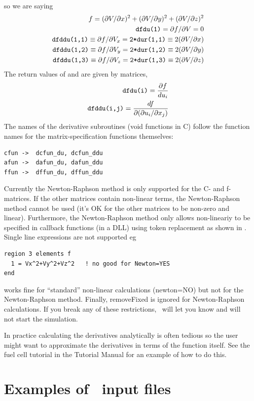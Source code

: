 \documentclass[a4paper,twoside,11pt]{book}
\begin{document}
so we are saying
\begin{eqnarray}
  f=(\partial V/\partial x)^2+(\partial V/\partial y)^2+(\partial V/\partial z)^2\\
  \texttt{dfdu(1)}=\partial f/\partial V = 0\\
  \texttt{dfddu(1,1)}\equiv \partial f/\partial V_x=\texttt{2*dur(1,1)}\equiv 2(\partial V/\partial x)\\
  \texttt{dfddu(1,2)}\equiv \partial f/\partial V_y=\texttt{2*dur(1,2)}\equiv 2(\partial V/\partial y)\\
  \texttt{dfddu(1,3)}\equiv \partial f/\partial V_z=\texttt{2*dur(1,3)}\equiv 2(\partial V/\partial z)
\end{eqnarray}
The return values of  and  are given by matrices,
\begin{eqnarray}
  \texttt{dfdu(i)}=\frac{\partial f}{d u_i}\\
  \texttt{dfddu(i,j)}=\frac{d f}{\partial(\partial u_i/\partial x_j)}
\end{eqnarray}
The names of the derivative subroutines (void functions in C) follow
the function names for the matrix-specification functions themselves:
\begin{verbatim}
cfun ->  dcfun_du, dcfun_ddu
afun ->  dafun_du, dafun_ddu
ffun ->  dffun_du, dffun_ddu
\end{verbatim}
Currently the Newton-Raphson method is only supported for the C- and
f-matrices. If the other matrices contain non-linear terms, the
Newton-Raphson method cannot be used (it's OK for the other matrices
to be non-zero and linear). Furthermore, the Newton-Raphson method
only allows non-lineariy to be specified in callback functions (in a
DLL) using token replacement as shown in . Single line
expressions are not supported eg
\begin{verbatim}
region 3 elements f
  1 = Vx^2+Vy^2+Vz^2   ! no good for Newton=YES
end
\end{verbatim}
works fine for ``standard'' non-linear calculations (newton=NO) but
not for the Newton-Raphson method. Finally, removeFixed is ignored for
Newton-Raphson calculations. If you break any of these restrictions,
\zinc\ will let you know and will not start the simulation.

In practice calculating the derivatives analytically is often tedious
so the user might want to approximate the derivatives in terms of the
function itself. See the fuel cell tutorial in the Tutorial Manual for
an example of how to do this.

\section{Examples of \zinc\ input files}
\end{document}
